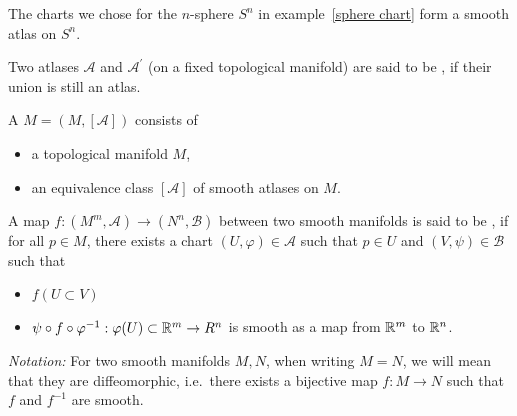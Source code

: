 \documentclass[a4paper,11pt]{article}
\begin{document}
\begin{example}
    The charts we chose for the \(n\)-sphere \(S^n\) in example\ \ref{sphere chart} form a smooth atlas on \(S^n\).
\end{example}

\begin{definition}\label{equivalence atlas}
    Two atlases \(\mathcal{A}\) and \(\mathcal{A}^\prime\) (on a fixed topological manifold) are said to be , if their union is still an atlas.
\end{definition}


\begin{definition}
    A  \(M=(M,[\mathcal{A}])\) consists of
    \begin{itemize}
        \item a topological manifold \(M\),
        \item an equivalence class \([\mathcal{A}]\) of smooth atlases on \(M\).
    \end{itemize}
\end{definition}

\begin{definition}
    A map \(f:(M^m,\mathcal{A})\to (N^n,\mathcal{B})\) between two smooth manifolds is said to be , if for all \(p\in M\), there exists a chart \((U,\varphi)\in\mathcal{A}\) such that \(p\in U\) and \((V,\psi)\in\mathcal{B}\) such that
    \begin{itemize}
        \item \(f(U\subset V)\)
        \item \(\psi\circ f\circ \varphi^{-1}:\varphi(U)\subset \mathbb{R}^m\to R^n\) is smooth as a map from \(\mathbb{R}^m\) to \(\mathbb{R}^n\).
    \end{itemize}
\end{definition}

\noindent\textit{Notation:}
    For two smooth manifolds \(M,N\), when writing \(M=N\), we will mean that they are diffeomorphic, i.e.\ there exists a bijective map \(f:M\to N\) such that \(f\) and \(f^{-1}\) are smooth. 
\end{document}
